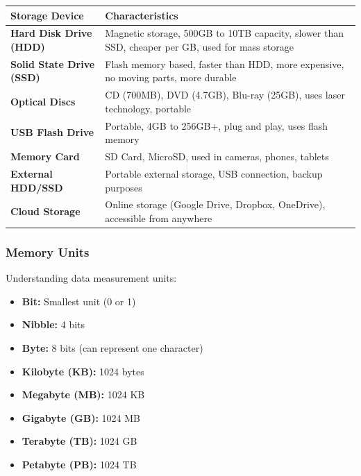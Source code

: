 \documentclass[12pt,a4paper]{article}
\begin{document}
\begin{longtable}{|p{3.5cm}|p{9.5cm}|}
\hline
\textbf{Storage Device} & \textbf{Characteristics} \\
\hline
\endhead

\textbf{Hard Disk Drive (HDD)} & Magnetic storage, 500GB to 10TB capacity, slower than SSD, cheaper per GB, used for mass storage \\
\hline

\textbf{Solid State Drive (SSD)} & Flash memory based, faster than HDD, more expensive, no moving parts, more durable \\
\hline

\textbf{Optical Discs} & CD (700MB), DVD (4.7GB), Blu-ray (25GB), uses laser technology, portable \\
\hline

\textbf{USB Flash Drive} & Portable, 4GB to 256GB+, plug and play, uses flash memory \\
\hline

\textbf{Memory Card} & SD Card, MicroSD, used in cameras, phones, tablets \\
\hline

\textbf{External HDD/SSD} & Portable external storage, USB connection, backup purposes \\
\hline

\textbf{Cloud Storage} & Online storage (Google Drive, Dropbox, OneDrive), accessible from anywhere \\
\hline

\end{longtable}

\subsubsection{Memory Units}
Understanding data measurement units:

\begin{itemize}
    \item \textbf{Bit:} Smallest unit (0 or 1)
    \item \textbf{Nibble:} 4 bits
    \item \textbf{Byte:} 8 bits (can represent one character)
    \item \textbf{Kilobyte (KB):} 1024 bytes
    \item \textbf{Megabyte (MB):} 1024 KB
    \item \textbf{Gigabyte (GB):} 1024 MB
    \item \textbf{Terabyte (TB):} 1024 GB
    \item \textbf{Petabyte (PB):} 1024 TB
\end{itemize}
\end{document}
